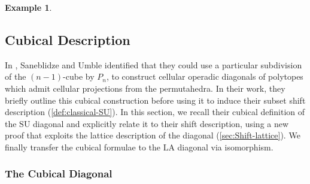 \documentclass{amsart}
\theoremstyle{definition}
\newtheorem{example}[theorem]{Example}
\newcommand{\SU}{\mathrm{SU}}
\newcommand{\LA}{\mathrm{LA}}
\begin{document}
\begin{example}
\begin{center}
{
}
\end{center}


\end{example}

\subsection{Cubical Description}\label{sec:Cubical}

In \cite{SaneblidzeUmble04}, Saneblidze and Umble identified that they could use a particular subdivision of the $(n-1)$-cube by $P_{n}$, to construct cellular operadic diagonals of polytopes which admit cellular projections from the permutahedra.
In their work, they briefly outline this cubical construction before using it to induce their subset shift description (\cref{def:classical-SU}).
In this section, we recall their cubical definition of the $\SU$ diagonal and explicitly relate it to their shift description, using a new proof that exploits the lattice description of the diagonal (\cref{sec:Shift-lattice}).
We finally transfer the cubical formulae to the $\LA$ diagonal via isomorphism.


\subsubsection{The Cubical Diagonal}
\end{document}
